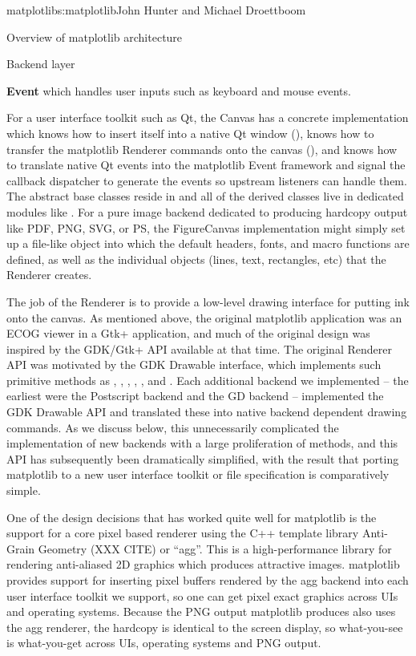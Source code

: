 \begin{aosachapter}{matplotlib}{s:matplotlib}{John Hunter and Michael Droettboom}
\begin{aosasect1}{Overview of matplotlib architecture}
\begin{aosasect2}{Backend layer}
\begin{aosaitemize}
\item \textbf{Event} which handles user inputs such as keyboard and
  mouse events.
\end{aosaitemize}
For a user interface toolkit such as Qt, the Canvas has a concrete
implementation which knows how to insert itself into a native Qt
window (), knows how to transfer the
matplotlib Renderer commands onto the canvas (),
and knows how to translate native Qt events into the matplotlib Event
framework and signal the callback dispatcher to generate the events so
upstream listeners can handle them.  The abstract base classes reside
in  and all of the derived classes
live in dedicated modules like
.  For a pure image backend
dedicated to producing hardcopy output like PDF, PNG, SVG, or PS, the
FigureCanvas implementation might simply set up a file-like object
into which the default headers, fonts, and macro functions are
defined, as well as the individual objects (lines, text, rectangles,
etc) that the Renderer creates.

The job of the Renderer is to provide a low-level drawing interface
for putting ink onto the canvas.  As mentioned above, the original
matplotlib application was an ECOG viewer in a Gtk+ application, and
much of the original design was inspired by the GDK/Gtk+ API available
at that time.  The original Renderer API was motivated by the GDK
Drawable interface, which implements such primitive methods as
, , ,
, , and .  Each
additional backend we implemented -- the earliest were the Postscript
backend and the GD backend -- implemented the GDK Drawable API and
translated these into native backend dependent drawing commands.  As
we discuss below, this unnecessarily complicated the implementation of
new backends with a large proliferation of methods, and this API has
subsequently been dramatically simplified, with the result that
porting matplotlib to a new user interface toolkit or file
specification is comparatively simple.

One of the design decisions that has worked quite well for matplotlib
is the support for a core pixel based renderer using the C++ template
library Anti-Grain Geometry (XXX CITE) or ``agg''.  This is a
high-performance library for rendering anti-aliased 2D graphics which
produces attractive images.  matplotlib provides support for inserting
pixel buffers rendered by the agg backend into each user interface
toolkit we support, so one can get pixel exact graphics across UIs and
operating systems.  Because the PNG output matplotlib produces also
uses the agg renderer, the hardcopy is identical to the screen
display, so what-you-see is what-you-get across UIs, operating systems
and PNG output.


\end{aosasect2}
\end{aosasect1}
\end{aosachapter}
